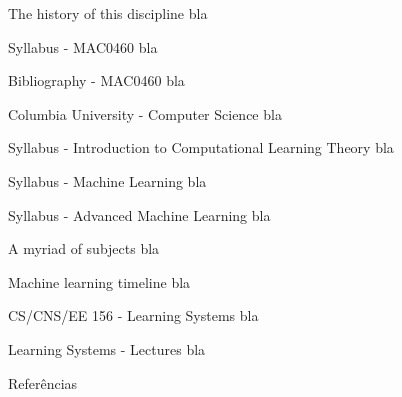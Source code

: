 \documentclass[10pt]{beamer}
\begin{document}
\nocite{learningfromdata}

\maketitle



\begin{frame}{The history of this discipline}
bla
\end{frame}

\begin{frame}{Syllabus - MAC0460}
bla
\end{frame}

\begin{frame}{Bibliography - MAC0460}
bla
\end{frame}

\begin{frame}{Columbia University - Computer Science}
bla
\end{frame}

\begin{frame}{Syllabus - Introduction to Computational Learning Theory}
bla
\end{frame}

\begin{frame}{Syllabus - Machine Learning}
bla
\end{frame}

\begin{frame}{Syllabus - Advanced Machine Learning}
bla
\end{frame}

\begin{frame}{A myriad of subjects}
bla
\end{frame}

\begin{frame}{Machine learning timeline}
bla
\end{frame}

\begin{frame}{CS/CNS/EE 156 - Learning Systems}
bla
\end{frame}


\begin{frame}{Learning Systems - Lectures}
bla
\end{frame}

\begin{frame}[allowframebreaks]{Referências}

  
  

\end{frame}
\end{document}
